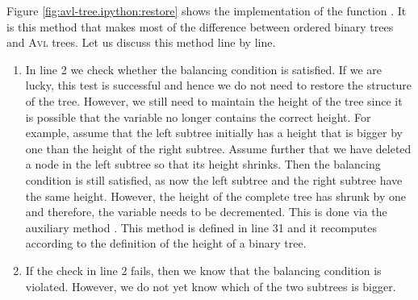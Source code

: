Figure \ref{fig:avl-tree.ipython:restore} shows the implementation of the function .
It is this method that makes most of the difference between ordered binary trees and \textsc{Avl} trees.  Let
us discuss this method line by line.
\begin{enumerate}
\item In line 2 we check whether the balancing condition is satisfied.  If we are lucky,  this test 
      is successful and hence we do not need to restore the structure of the tree.  However, we
      still need to maintain the height of the tree since it is possible that the variable
       no longer contains the correct height.  For example, assume that the left subtree
      initially has a height that is bigger by one than the height of the right subtree.  Assume
      further that we have deleted a node in the left subtree so that its height shrinks.  Then the
      balancing condition is still satisfied, as now the left subtree and the right subtree have the
      same height.  However, the height of the complete tree has shrunk by one and therefore, 
      the variable  needs to be decremented.  This is done via the auxiliary method
      .  This method is defined in line 31 and it recomputes 
      according to the definition of the height of a binary tree.
\item If the check in line 2 fails, then we know that the balancing condition is violated.
      However, we do not yet know which of the two subtrees is bigger.  


\end{enumerate}
